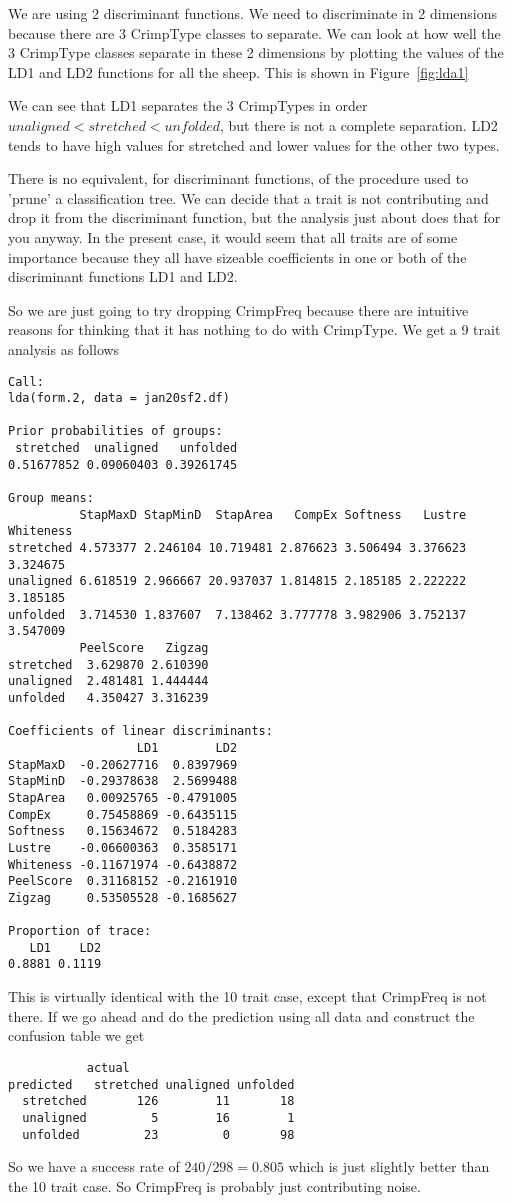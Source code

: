 \documentclass[titlepage]{article}  %
\begin{document}
We are using 2 discriminant functions. We need to discriminate in 2 dimensions because there are 3 CrimpType classes to separate. We can look at how well the 3 CrimpType classes separate in these 2 dimensions by plotting the values of the LD1 and LD2 functions for all the sheep. This is shown in Figure~\ref{fig:lda1}

We can see that LD1 separates the 3 CrimpTypes in order $unaligned < stretched < unfolded$, but there is not a complete separation. LD2 tends to have high values for stretched and lower values for the other two types.

There is no equivalent, for discriminant functions, of the procedure used to 'prune' a classification tree. We can decide that a trait is not contributing and drop it from the discriminant function, but the analysis just about does that for you anyway. In the present case, it would seem that all traits are of some importance because they all have sizeable coefficients in one or both of the discriminant functions LD1 and LD2.

So we are just going to try dropping CrimpFreq because there are intuitive reasons for thinking that it has nothing to do with CrimpType. We get a 9 trait analysis as follows
\begin{verbatim}
Call:
lda(form.2, data = jan20sf2.df)

Prior probabilities of groups:
 stretched  unaligned   unfolded 
0.51677852 0.09060403 0.39261745 

Group means:
          StapMaxD StapMinD  StapArea   CompEx Softness   Lustre Whiteness
stretched 4.573377 2.246104 10.719481 2.876623 3.506494 3.376623  3.324675
unaligned 6.618519 2.966667 20.937037 1.814815 2.185185 2.222222  3.185185
unfolded  3.714530 1.837607  7.138462 3.777778 3.982906 3.752137  3.547009
          PeelScore   Zigzag
stretched  3.629870 2.610390
unaligned  2.481481 1.444444
unfolded   4.350427 3.316239

Coefficients of linear discriminants:
                  LD1        LD2
StapMaxD  -0.20627716  0.8397969
StapMinD  -0.29378638  2.5699488
StapArea   0.00925765 -0.4791005
CompEx     0.75458869 -0.6435115
Softness   0.15634672  0.5184283
Lustre    -0.06600363  0.3585171
Whiteness -0.11671974 -0.6438872
PeelScore  0.31168152 -0.2161910
Zigzag     0.53505528 -0.1685627

Proportion of trace:
   LD1    LD2 
0.8881 0.1119 
\end{verbatim}

This is virtually identical with the 10 trait case, except that CrimpFreq is not there. If we go ahead and do the prediction using all data and construct the confusion table we get
\begin{verbatim}
           actual
predicted   stretched unaligned unfolded
  stretched       126        11       18
  unaligned         5        16        1
  unfolded         23         0       98
\end{verbatim}
So we have a success rate of $240/298 = 0.805 $ which is just slightly better than the 10 trait case. So CrimpFreq is probably just contributing noise.
\end{document}
